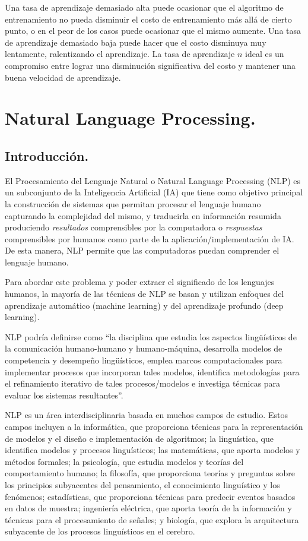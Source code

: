\documentclass[12pt,a4paper]{article}
\begin{document}
\begin{sloppypar}
Una tasa de aprendizaje demasiado alta puede ocasionar que el algoritmo de entrenamiento no pueda disminuir el costo de entrenamiento más allá de cierto punto, o en el peor de los casos puede ocasionar que el mismo aumente. Una tasa de aprendizaje demasiado baja puede hacer que el costo disminuya muy lentamente, ralentizando el aprendizaje. La tasa de aprendizaje $n$ ideal es un compromiso entre lograr una disminución significativa del costo y mantener una buena velocidad de aprendizaje\cite{ANN_25}.
\cleardoublepage

\section{Natural Language Processing.}\label{4.NaturalLanguageProcessing}

\subsection{Introducción.}\label{Intro_NLP}

El Procesamiento del Lenguaje Natural o Natural Language Processing (NLP) es un subconjunto de la Inteligencia Artificial (IA) que tiene como objetivo principal la construcción de sistemas que permitan procesar el lenguaje humano capturando la complejidad del mismo, y traducirla en información resumida produciendo \textit{resultados} comprensibles por la computadora o \textit{respuestas} comprensibles por humanos como parte de la aplicación/implementación de IA. De esta manera, NLP permite que las computadoras puedan comprender el lenguaje humano.

Para abordar este problema y poder extraer el significado de los lenguajes humanos, la mayoría de las técnicas de NLP se basan y utilizan enfoques del aprendizaje automático (machine learning) y del aprendizaje profundo (deep learning)\cite{NLP_1, NLP_2}.

NLP podría definirse como ``la disciplina que estudia los aspectos lingüísticos de la comunicación humano-humano y humano-máquina, desarrolla modelos de competencia y desempeño lingüísticos, emplea marcos computacionales para implementar procesos que incorporan tales modelos, identifica metodologías para el refinamiento iterativo de tales procesos/modelos e investiga técnicas para evaluar los sistemas resultantes''\cite{NLP_3_4}.

NLP es un área interdisciplinaria basada en muchos campos de estudio. Estos campos incluyen a la informática, que proporciona técnicas para la representación de modelos y el diseño e implementación de algoritmos; la linguística, que identifica modelos y procesos linguísticos; las matemáticas, que aporta modelos y métodos formales; la psicología, que estudia modelos y teorías del comportamiento humano; la filosofía, que proporciona teorías y preguntas sobre los principios subyacentes del pensamiento, el conocimiento linguístico y los fenómenos; estadísticas, que proporciona técnicas para predecir eventos basados en datos de muestra; ingeniería eléctrica, que aporta teoría de la información y técnicas para el procesamiento de señales; y biología, que explora la arquitectura subyacente de los procesos linguísticos en el cerebro\cite{NLP_3_4}.


\end{sloppypar}
\end{document}
